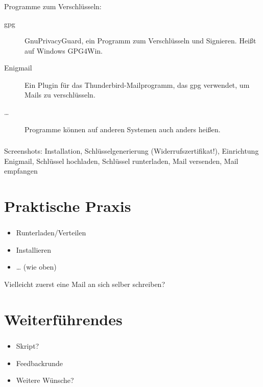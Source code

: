 \documentclass[compress]{beamer}
\begin{document}
\begin{frame}
  \frametitle{\insertsection}
  Programme zum Verschlüsseln:

  \begin{description}
  \item[gpg] \alert{G}nu\alert{P}rivacy\alert{G}uard, ein Programm zum
    Verschlüsseln und Signieren.  Heißt auf Windows \alert{GPG4Win}.
  \item[Enigmail] Ein Plugin für das Thunderbird-Mailprogramm, das gpg
    verwendet, um Mails zu verschlüsseln.
  \item[\ldots] Programme können auf anderen Systemen auch anders
    heißen.
  \end{description}

\end{frame}

\begin{frame}
  \frametitle{\insertsection}
  Screenshots: Installation, Schlüsselgenerierung
  (Widerrufszertifikat!), Einrichtung Enigmail, Schlüssel hochladen,
  Schlüssel runterladen, Mail versenden, Mail empfangen
\end{frame}
\section{Praktische Praxis}
\label{sec-1-1-6}

\begin{frame}
  \frametitle{\insertsection}
  \begin{itemize}
  \item Runterladen/Verteilen
  \item Installieren
  \item \ldots{} (wie oben)
  \end{itemize}
  Vielleicht zuerst eine Mail an sich selber schreiben?
\end{frame}

\section{Weiterführendes}
\label{sec-1-1-7}

\begin{frame}
  \frametitle{\insertsection}
  \begin{itemize}
  \item Skript?
  \item Feedbackrunde
  \item Weitere Wünsche?
  \end{itemize}
\end{frame}
\end{document}
